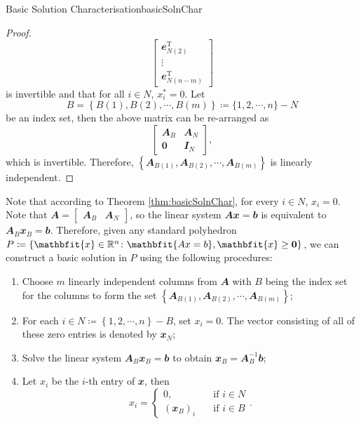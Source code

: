\documentclass[math, code]{amznotes}
\theoremstyle{remark}
\begin{document}
\begin{thmbox}{Basic Solution Characterisation}{basicSolnChar}
\begin{proof}
\begin{equation*}
\begin{bmatrix}
                \mathbfit{e}^{\mathrm{T}}_{N(2)} \\
                \vdots \\
                \mathbfit{e}^{\mathrm{T}}_{N(n - m)}
            \end{bmatrix}
        \end{equation*}
        is invertible and that for all $i \in N$, $x^*_i = 0$. Let 
        \begin{equation*}
            B = \left\{B(1), B(2), \cdots, B(m)\right\} \coloneqq \{1, 2, \cdots, n\} - N
        \end{equation*}
        be an index set, then the above matrix can be re-arranged as
        \begin{equation*}
            \begin{bmatrix}
                \mathbfit{A}_B & \mathbfit{A}_N \\
                \mathbf{0} & \mathbfit{I}_N
            \end{bmatrix},
        \end{equation*}
        which is invertible. Therefore, $\left\{\mathbfit{A}_{B(1)}, \mathbfit{A}_{B(2)}, \cdots, \mathbfit{A}_{B(m)}\right\}$ is linearly independent.
    \end{proof}
\end{thmbox}
Note that according to Theorem \ref{thm:basicSolnChar}, for every $i \in N$, $x_i = 0$. Note that $\mathbfit{A} = \begin{bmatrix}
    \mathbfit{A}_B & \mathbfit{A}_N
\end{bmatrix}$, so the linear system  $\mathbfit{Ax = b}$ is equivalent to  $\mathbfit{A}_B\mathbfit{x}_B = \mathbfit{b}$. Therefore, given any standard polyhedron $P \coloneqq \left\{\mathbfit{x} \in \R^n \colon \mathbfit{Ax = b}, \mathbfit{x} \geq \mathbf{0}\right\}$, we can construct a basic solution in $P$ using the following procedures:
\begin{enumerate}
    \item Choose $m$ linearly independent columns from $\mathbfit{A}$ with $B$ being the index set for the columns to form the set $\left\{\mathbfit{A}_{B(1)}, \mathbfit{A}_{B(2)}, \cdots, \mathbfit{A}_{B(m)}\right\}$;
    \item For each $i \in N \coloneqq \left\{1, 2, \cdots, n\right\} - B$, set $x_i = 0$. The vector consisting of all of these zero entries is denoted by $\mathbfit{x}_N$;
    \item Solve the linear system $\mathbfit{A}_B\mathbfit{x}_B = \mathbfit{b}$ to obtain $\mathbfit{x}_B = \mathbfit{A}_B^{-1}\mathbfit{b}$;
    \item Let $x_i$ be the $i$-th entry of $\mathbfit{x}$, then 
    \begin{equation*}
        x_i = \begin{cases}
            0, & \quad\textrm{if } i \in N \\
            (\mathbfit{x}_B)_i & \quad\textrm{if } i \in B
        \end{cases}.
    \end{equation*}
\end{enumerate}
\end{document}
